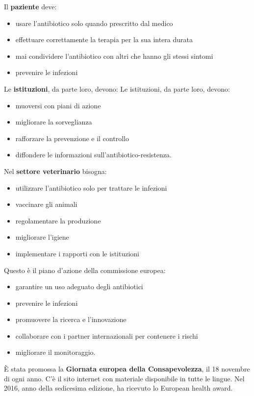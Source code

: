 Il \textbf{paziente} deve:
\begin{itemize}
\item usare l'antibiotico solo quando prescritto dal medico
\item effettuare correttamente la terapia per la sua intera durata
\item mai condividere l'antibiotico con altri che hanno gli stessi sintomi
\item prevenire le infezioni
\end{itemize}

Le \textbf{istituzioni}, da parte loro, devono:
Le istituzioni, da parte loro, devono:

\begin{itemize}
\item muoversi con piani di azione
\item migliorare la sorveglianza
\item rafforzare la prevenzione e il controllo
\item diffondere le informazioni sull'antibiotico-resistenza.
\end{itemize}

Nel \textbf{settore veterinario} bisogna:

\begin{itemize}
\item utilizzare l'antibiotico solo per trattare le infezioni
\item vaccinare gli animali
\item regolamentare la produzione
\item migliorare l'igiene
\item implementare i rapporti con le istituzioni
\end{itemize}

Questo è il piano d'azione della commissione europea:

\begin{itemize}
\item garantire un uso adeguato degli antibiotici
\item prevenire le infezioni
\item promuovere la ricerca e l'innovazione
\item collaborare con i partner internazionali per contenere i rischi
\item migliorare il monitoraggio.
\end{itemize}

È stata promossa la \textbf{Giornata europea della Consapevolezza}, il 18 novembre di ogni anno. C'è il sito internet con materiale disponibile in tutte le lingue. Nel 2016, anno della sedicesima edizione, ha ricevuto lo European health award.

